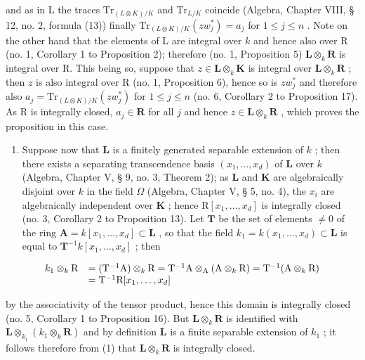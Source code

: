 and as in L the traces \(\mathrm{Tr}_{(L\otimes K)/K}\) and \(\mathrm{Tr}_{L/K}\) coincide (Algebra, Chapter VIII, § 12, no. 2, formula (13)) finally \(\mathrm{Tr}_{(L\otimes K)/K}(zw_j^*) = a_j\) for \(1 \leqslant j \leqslant n\) . Note on the other hand that the elements of L are integral over \(k\) and hence also over R (no. 1, Corollary 1 to Proposition 2); therefore (no. 1, Proposition 5) \(\mathbf{L} \otimes_k \mathbf{R}\) is integral over R. This being so, suppose that \(z \in \mathbf{L} \otimes_k \mathbf{K}\) is integral over \(\mathbf{L} \otimes_k \mathbf{R}\) ; then \(z\) is also integral over R (no. 1, Proposition 6), hence so is \(zw_j^*\) and therefore also \(a_j = \mathrm{Tr}_{(L\otimes K)/K}(zw_j^*)\) for \(1 \leqslant j \leqslant n\) (no. 6, Corollary 2 to Proposition 17). As R is integrally closed, \(a_j \in \mathbf{R}\) for all \(j\) and hence \(z \in \mathbf{L} \otimes_k \mathbf{R}\) , which proves the proposition in this case.

\begin{enumerate}
\def\labelenumi{(\arabic{enumi})}
\setcounter{enumi}{1}
\tightlist
\item
  Suppose now that \(\mathbf{L}\) is a finitely generated separable extension of \(k\) ; then there exists a separating transcendence basis \((x_1, \ldots, x_d)\) of \(\mathbf{L}\) over \(k\) (Algebra, Chapter V, § 9, no. 3, Theorem 2); as \(\mathbf{L}\) and \(\mathbf{K}\) are algebraically disjoint over \(k\) in the field \(\Omega\) (Algebra, Chapter V, § 5, no. 4), the \(x_i\) are algebraically independent over \(\mathbf{K}\) ; hence \(\mathrm{R}[x_1, \ldots, x_d]\) is integrally closed (no. 3, Corollary 2 to Proposition 13). Let \(\mathbf{T}\) be the set of elements \(\neq 0\) of the ring \(\mathbf{A} = k[x_1, \ldots, x_d] \subset \mathbf{L}\) , so that the field \(k_1 = k(x_1, \ldots, x_d) \subset \mathbf{L}\) is equal to \(\mathbf{T}^{-1} k[x_1, \ldots, x_d]\) ; then
\end{enumerate}

\[
\begin{array}{r l} k _ {1} \otimes_ {k} \mathrm{R} & = (\mathrm{T} ^ {- 1} \mathrm{A}) \otimes_ {k} \mathrm{R} = \mathrm{T} ^ {- 1} \mathrm{A} \otimes_ {\mathrm{A}} (\mathrm{A} \otimes_ {k} \mathrm{R}) = \mathrm{T} ^ {- 1} (\mathrm{A} \otimes_ {k} \mathrm{R}) \\ & = \mathrm{T} ^ {- 1} \mathrm{R} [ x _ {1}, \dots , x _ {d} ] \end{array}
\]

by the associativity of the tensor product, hence this domain is integrally closed (no. 5, Corollary 1 to Proposition 16). But \(\mathbf{L} \otimes_k \mathbf{R}\) is identified with \(\mathbf{L} \otimes_{k_1} (k_1 \otimes_k \mathbf{R})\) and by definition \(\mathbf{L}\) is a finite separable extension of \(k_1\) ; it follows therefore from (1) that \(\mathbf{L} \otimes_k \mathbf{R}\) is integrally closed.

